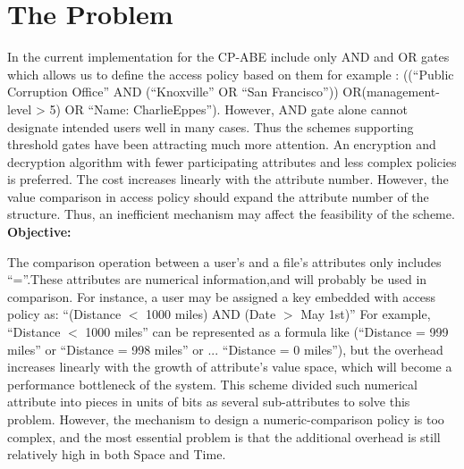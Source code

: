 \chapter{ The Problem}


In the current implementation for the CP-ABE include only AND and OR gates which allows us to define the access policy based on them for example : ((“Public Corruption Office” AND (“Knoxville” OR “San Francisco”)) OR(management-level > 5) OR “Name: CharlieEppes”).
However, AND gate alone cannot designate intended users well in many cases. Thus the schemes supporting threshold gates have been attracting much more attention. An encryption and decryption algorithm with fewer participating attributes and less complex policies is preferred. The cost increases linearly with the attribute number. However, the value comparison in access policy should expand the attribute number of the structure. Thus, an inefficient mechanism may affect the feasibility of the scheme. 
\\

\noindent \textbf{Objective:}\par
The comparison operation between a user’s and a file’s attributes only includes “=”.These attributes are numerical information,and will probably be used in comparison. For instance, a user may be assigned a key embedded with access policy as: “(Distance \(<\) 1000 miles) AND (Date \(>\)  May 1st)” For example, “Distance \(<\) 1000 miles” can be represented as a formula like (“Distance = 999 miles” or “Distance = 998 miles”  or  ... “Distance = 0 miles”), but the overhead increases linearly with the growth of attribute’s value space, which will become a performance bottleneck of the system. This scheme divided such numerical attribute into pieces in units of bits as several sub-attributes to solve this problem. However, the mechanism to design a numeric-comparison policy is too complex, and the most essential problem is that the additional overhead is still relatively high in both Space and Time.



